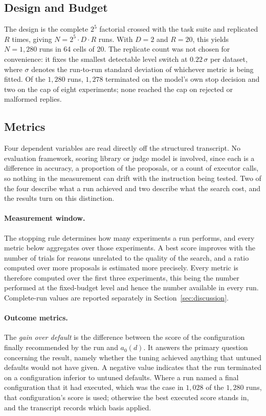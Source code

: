\documentclass[11pt]{article}
\begin{document}
\subsection{Design and Budget}

The design is the complete $2^5$ factorial crossed with the task suite and replicated $R$ times, giving $N = 2^5 \cdot D \cdot R$ runs. With $D=2$ and $R=20$, this yields $N=1{,}280$ runs in 64 cells of 20. The replicate count was not chosen for convenience: it fixes the smallest detectable level switch at $0.22\,\sigma$ per dataset, where $\sigma$ denotes the run-to-run standard deviation of whichever metric is being fitted. Of the $1{,}280$ runs, $1{,}278$ terminated on the model's own stop decision and two on the cap of eight experiments; none reached the cap on rejected or malformed replies.

\subsection{Metrics}

Four dependent variables are read directly off the structured transcript. No evaluation framework, scoring library or judge model is involved, since each is a difference in accuracy, a proportion of the proposals, or a count of executor calls, so nothing in the measurement can drift with the instruction being tested. Two of the four describe what a run achieved and two describe what the search cost, and the results turn on this distinction.

\paragraph{Measurement window.} The stopping rule determines how many experiments a run performs, and every metric below aggregates over those experiments. A best score improves with the number of trials for reasons unrelated to the quality of the search, and a ratio computed over more proposals is estimated more precisely. Every metric is therefore computed over the first three experiments, this being the number performed at the fixed-budget level and hence the number available in every run. Complete-run values are reported separately in Section~\ref{sec:discussion}.

\paragraph{Outcome metrics.} The \emph{gain over default} is the difference between the score of the configuration finally recommended by the run and $a_0(d)$. It answers the primary question concerning the result, namely whether the tuning achieved anything that untuned defaults would not have given. A negative value indicates that the run terminated on a configuration inferior to untuned defaults. Where a run named a final configuration that it had executed, which was the case in $1{,}028$ of the $1{,}280$ runs, that configuration's score is used; otherwise the best executed score stands in, and the transcript records which basis applied.
\end{document}
